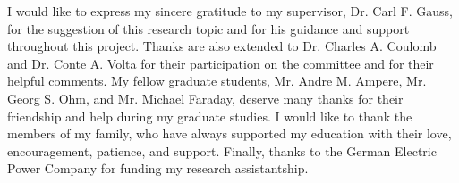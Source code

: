 


\fancyhf{}
\cfoot{\thepage}
\chead{\th}

\SgAddTitle%
\begin{acknowledgments}
I would like to express my sincere gratitude to my supervisor,
Dr. Carl F. Gauss, for the suggestion of this research topic and for his
guidance and support throughout this project.
Thanks are also extended to Dr. Charles A. Coulomb and Dr. Conte A. Volta
for their participation on the committee and for their helpful comments.
My fellow graduate students, Mr. Andre M. Ampere, Mr. Georg S. Ohm, and
Mr. Michael Faraday, deserve many thanks for their friendship and help during
my graduate studies.
I would like to thank the members of my family, who have always supported my
education with their love, encouragement, patience, and support.
Finally, thanks to the German Electric Power Company for funding my research
assistantship.
\end{acknowledgments}



\SgAddToc%
\SgAddLof%
\SgAddLot%
\SgAddLoa%

%
